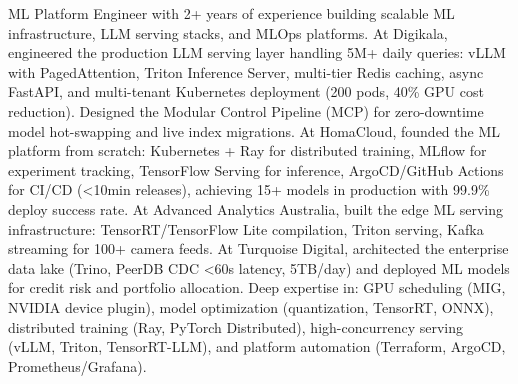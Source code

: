 \small{ML Platform Engineer with 2+ years of experience building scalable ML infrastructure, LLM serving stacks, and MLOps platforms. At Digikala, engineered the production LLM serving layer handling 5M+ daily queries: vLLM with PagedAttention, Triton Inference Server, multi-tier Redis caching, async FastAPI, and multi-tenant Kubernetes deployment (200 pods, 40\% GPU cost reduction). Designed the Modular Control Pipeline (MCP) for zero-downtime model hot-swapping and live index migrations. At HomaCloud, founded the ML platform from scratch: Kubernetes + Ray for distributed training, MLflow for experiment tracking, TensorFlow Serving for inference, ArgoCD/GitHub Actions for CI/CD (<10min releases), achieving 15+ models in production with 99.9\% deploy success rate. At Advanced Analytics Australia, built the edge ML serving infrastructure: TensorRT/TensorFlow Lite compilation, Triton serving, Kafka streaming for 100+ camera feeds. At Turquoise Digital, architected the enterprise data lake (Trino, PeerDB CDC <60s latency, 5TB/day) and deployed ML models for credit risk and portfolio allocation. Deep expertise in: GPU scheduling (MIG, NVIDIA device plugin), model optimization (quantization, TensorRT, ONNX), distributed training (Ray, PyTorch Distributed), high-concurrency serving (vLLM, Triton, TensorRT-LLM), and platform automation (Terraform, ArgoCD, Prometheus/Grafana).}\vspace{4pt}